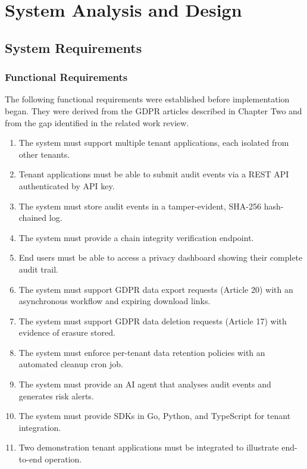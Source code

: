 \documentclass[a4paper,12pt,onecolumn]{report}
\begin{document}
\chapter{System Analysis and Design}

\section{System Requirements}

\subsection{Functional Requirements}

The following functional requirements were established before implementation began.
They were derived from the GDPR articles described in Chapter Two and from the gap identified in the related work review.

\begin{enumerate}[leftmargin=*, label=FR-\arabic*.]
    \item The system must support multiple tenant applications, each isolated from other tenants.
    \item Tenant applications must be able to submit audit events via a REST API authenticated by API key.
    \item The system must store audit events in a tamper-evident, SHA-256 hash-chained log.
    \item The system must provide a chain integrity verification endpoint.
    \item End users must be able to access a privacy dashboard showing their complete audit trail.
    \item The system must support GDPR data export requests (Article 20) with an asynchronous workflow and expiring download links.
    \item The system must support GDPR data deletion requests (Article 17) with evidence of erasure stored.
    \item The system must enforce per-tenant data retention policies with an automated cleanup cron job.
    \item The system must provide an AI agent that analyses audit events and generates risk alerts.
    \item The system must provide SDKs in Go, Python, and TypeScript for tenant integration.
    \item Two demonstration tenant applications must be integrated to illustrate end-to-end operation.
\end{enumerate}
\end{document}
